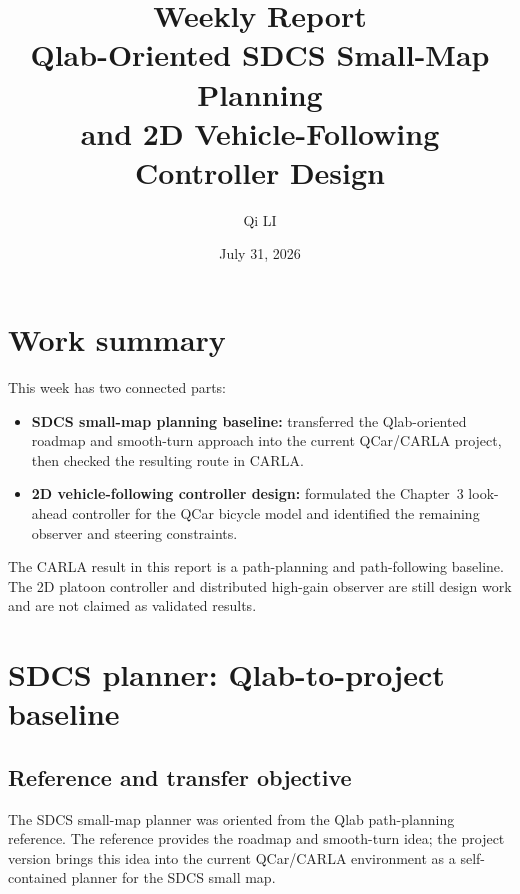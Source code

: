 \documentclass[11pt,a4paper]{article}
\title{\textbf{Weekly Report}\\[4pt]\large Qlab-Oriented SDCS Small-Map Planning\\and 2D Vehicle-Following Controller Design}
\author{Qi LI}
\date{July 31, 2026}
\begin{document}
\setcounter{tocdepth}{1}
\twocolumn[
\maketitle
\tableofcontents
\vspace{.3em}
]
\small

\section{Work summary}
This week has two connected parts:
\begin{itemize}[leftmargin=*]
    \item \textbf{SDCS small-map planning baseline:} transferred the Qlab-oriented roadmap and smooth-turn approach into the current QCar/CARLA project, then checked the resulting route in CARLA.
\item \textbf{2D vehicle-following controller design:} formulated the Chapter~3 look-ahead controller for the QCar bicycle model and identified the remaining observer and steering constraints.
\end{itemize}

The CARLA result in this report is a path-planning and path-following baseline. The 2D platoon controller and distributed high-gain observer are still design work and are not claimed as validated results.

\section{SDCS planner: Qlab-to-project baseline}

\subsection{Reference and transfer objective}
The SDCS small-map planner was oriented from the Qlab path-planning reference. The reference provides the roadmap and smooth-turn idea; the project version brings this idea into the current QCar/CARLA environment as a self-contained planner for the SDCS small map.
\end{document}
